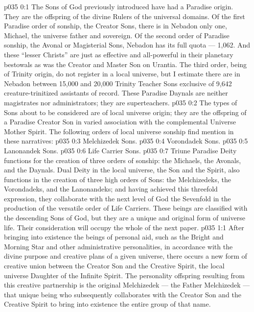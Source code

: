 \author{Chief of Archangels}
\vs p035 0:1 The Sons of God previously introduced have had a Paradise origin. They are the offspring of the divine Rulers of the universal domains. Of the first Paradise order of sonship, the Creator Sons, there is in Nebadon only one, Michael, the universe father and sovereign. Of the second order of Paradise sonship, the Avonal or Magisterial Sons, Nebadon has its full quota --- 1,062. And these “lesser Christs” are just as effective and all\hyp{}powerful in their planetary bestowals as was the Creator and Master Son on Urantia. The third order, being of Trinity origin, do not register in a local universe, but I estimate there are in Nebadon between 15,000 and 20,000 Trinity Teacher Sons exclusive of 9,642 creature\hyp{}trinitized assistants of record. These Paradise Daynals are neither magistrates nor administrators; they are superteachers.
\vs p035 0:2 The types of Sons about to be considered are of local universe origin; they are the offspring of a Paradise Creator Son in varied association with the complemental Universe Mother Spirit. The following orders of local universe sonship find mention in these narratives:
\vs p035 0:3 \bibnobreakspace Melchizedek Sons.
\vs p035 0:4 \bibnobreakspace Vorondadek Sons.
\vs p035 0:5 \bibnobreakspace Lanonandek Sons.
\vs p035 0:6 \bibnobreakspace Life Carrier Sons.
\vs p035 0:7 \pc Triune Paradise Deity functions for the creation of three orders of sonship: the Michaels, the Avonals, and the Daynals. Dual Deity in the local universe, the Son and the Spirit, also functions in the creation of three high orders of Sons: the Melchizedeks, the Vorondadeks, and the Lanonandeks; and having achieved this threefold expression, they collaborate with the next level of God the Sevenfold in the production of the versatile order of Life Carriers. These beings are classified with the descending Sons of God, but they are a unique and original form of universe life. Their consideration will occupy the whole of the next paper.
\vs p035 1:1 After bringing into existence the beings of personal aid, such as the Bright and Morning Star and other administrative personalities, in accordance with the divine purpose and creative plans of a given universe, there occurs a new form of creative union between the Creator Son and the Creative Spirit, the local universe Daughter of the Infinite Spirit. The personality offspring resulting from this creative partnership is the original Melchizedek --- the Father Melchizedek --- that unique being who subsequently collaborates with the Creator Son and the Creative Spirit to bring into existence the entire group of that name.
